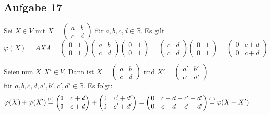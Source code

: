 \documentclass[a4paper,graphics,11pt]{article}
\newcommand{\aufgabe}[1]{\subsection*{Aufgabe #1}}
\newcommand{\up}[2]{\mathrel{\overset{\makebox[0pt]{\mbox{\normalfont\tiny #2}}}{#1}}}
\begin{document}
\aufgabe{17}
Sei $X \in V$ mit
$X = \begin{pmatrix}
        a & b\\
	    c & d
    \end{pmatrix}
$
für $a,b,c,d \in \mathbb{R}$. Es gilt
\begin{equation}
    \varphi(X)
    = AXA
    = \begin{pmatrix}
		0 & 1\\
		0 & 1
	\end{pmatrix}
    \begin{pmatrix}
		a & b\\
		c & d
	\end{pmatrix}
    \begin{pmatrix}
		0 & 1\\
		0 & 1
	\end{pmatrix}
    = \begin{pmatrix}
		c & d\\
		c & d
	\end{pmatrix}
    \begin{pmatrix}
		0 & 1\\
		0 & 1
	\end{pmatrix}
    = 
    \begin{pmatrix}
		0 & c+d\\
		0 & c+d
	\end{pmatrix}
\end{equation}

Seien nun $X, X' \in V$. Dann ist
$X = \begin{pmatrix}
        a & b\\
	    c & d
    \end{pmatrix}
$ und $
X' = \begin{pmatrix}
        a' & b'\\
        c' & d'
    \end{pmatrix}
$
\\
für $a,b,c,d,a',b',c',d' \in \mathbb{R}$. Es folgt:
$$
    \varphi(X) + \varphi(X')
    \up{=}{(1)} \begin{pmatrix}
		0 & c+d\\
		0 & c+d
	\end{pmatrix}
    + 
    \begin{pmatrix}
		0 & c'+d'\\
		0 & c'+d'
	\end{pmatrix}
    =
    \begin{pmatrix}
		0 & c+d+c'+d'\\
		0 & c+d+c'+d'
	\end{pmatrix}
    \up{=}{(1)}
    \varphi(X+X')
$$
\end{document}
